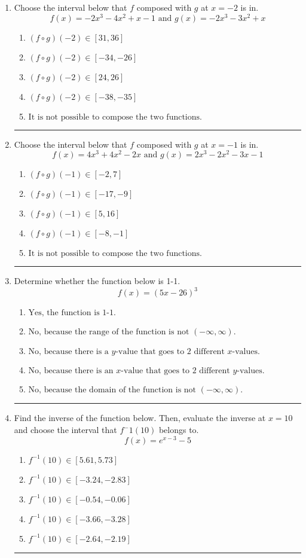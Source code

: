 \documentclass[14pt]{extbook}
\newcommand{\litem}[1]{\item#1\hspace*{-1cm}\rule{\textwidth}{0.4pt}}
\begin{document}
\begin{enumerate}
{\begin{enumerate}[label=\Alph*.]
\end{enumerate} }
\litem{
Choose the interval below that $f$ composed with $g$ at $x=-2$ is in.\[ f(x) = -2x^{3} -4 x^{2} +x -1 \text{ and } g(x) = -2x^{3} -3 x^{2} +x \]\begin{enumerate}[label=\Alph*.]
\item \( (f \circ g)(-2) \in [31, 36] \)
\item \( (f \circ g)(-2) \in [-34, -26] \)
\item \( (f \circ g)(-2) \in [24, 26] \)
\item \( (f \circ g)(-2) \in [-38, -35] \)
\item \( \text{It is not possible to compose the two functions.} \)

\end{enumerate} }
\litem{
Choose the interval below that $f$ composed with $g$ at $x=-1$ is in.\[ f(x) = 4x^{3} +4 x^{2} -2 x \text{ and } g(x) = 2x^{3} -2 x^{2} -3 x -1 \]\begin{enumerate}[label=\Alph*.]
\item \( (f \circ g)(-1) \in [-2, 7] \)
\item \( (f \circ g)(-1) \in [-17, -9] \)
\item \( (f \circ g)(-1) \in [5, 16] \)
\item \( (f \circ g)(-1) \in [-8, -1] \)
\item \( \text{It is not possible to compose the two functions.} \)

\end{enumerate} }
\litem{
Determine whether the function below is 1-1.\[ f(x) = (5 x - 26)^3 \]\begin{enumerate}[label=\Alph*.]
\item \( \text{Yes, the function is 1-1.} \)
\item \( \text{No, because the range of the function is not $(-\infty, \infty)$.} \)
\item \( \text{No, because there is a $y$-value that goes to 2 different $x$-values.} \)
\item \( \text{No, because there is an $x$-value that goes to 2 different $y$-values.} \)
\item \( \text{No, because the domain of the function is not $(-\infty, \infty)$.} \)

\end{enumerate} }
\litem{
Find the inverse of the function below. Then, evaluate the inverse at $x = 10$ and choose the interval that $f^-1(10)$ belongs to.\[ f(x) = e^{x-3}-5 \]\begin{enumerate}[label=\Alph*.]
\item \( f^{-1}(10) \in [5.61, 5.73] \)
\item \( f^{-1}(10) \in [-3.24, -2.83] \)
\item \( f^{-1}(10) \in [-0.54, -0.06] \)
\item \( f^{-1}(10) \in [-3.66, -3.28] \)
\item \( f^{-1}(10) \in [-2.64, -2.19] \)


\end{enumerate}}
\end{enumerate}
\end{document}
